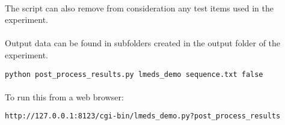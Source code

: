 \paragraph{}
The script can also remove from consideration any test items used in the experiment.

\paragraph{}
Output data can be found in subfolders created in the output folder of the experiment.

\begin{lstlisting}
python post_process_results.py lmeds_demo sequence.txt false
\end{lstlisting}

\paragraph{}
To run this from a web browser:
\begin{lstlisting}
http://127.0.0.1:8123/cgi-bin/lmeds_demo.py?post_process_results
\end{lstlisting}

